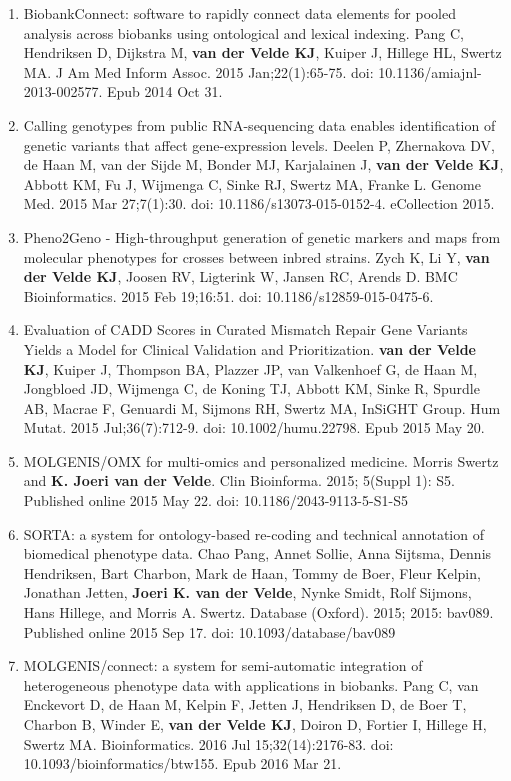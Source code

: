 \begin{appendices}
\begin{enumerate}
\item BiobankConnect: software to rapidly connect data elements for pooled analysis across biobanks using ontological and lexical indexing. Pang C, Hendriksen D, Dijkstra M, \textbf{van der Velde KJ}, Kuiper J, Hillege HL, Swertz MA. J Am Med Inform Assoc. 2015 Jan;22(1):65-75. doi: 10.1136/amiajnl-2013-002577. Epub 2014 Oct 31.
\item Calling genotypes from public RNA-sequencing data enables identification of genetic variants that affect gene-expression levels. Deelen P, Zhernakova DV, de Haan M, van der Sijde M, Bonder MJ, Karjalainen J, \textbf{van der Velde KJ}, Abbott KM, Fu J, Wijmenga C, Sinke RJ, Swertz MA, Franke L. Genome Med. 2015 Mar 27;7(1):30. doi: 10.1186/s13073-015-0152-4. eCollection 2015.
\item Pheno2Geno - High-throughput generation of genetic markers and maps from molecular phenotypes for crosses between inbred strains. Zych K, Li Y, \textbf{van der Velde KJ}, Joosen RV, Ligterink W, Jansen RC, Arends D. BMC Bioinformatics. 2015 Feb 19;16:51. doi: 10.1186/s12859-015-0475-6.
\item Evaluation of CADD Scores in Curated Mismatch Repair Gene Variants Yields a Model for Clinical Validation and Prioritization. \textbf{van der Velde KJ}, Kuiper J, Thompson BA, Plazzer JP, van Valkenhoef G, de Haan M, Jongbloed JD, Wijmenga C, de Koning TJ, Abbott KM, Sinke R, Spurdle AB, Macrae F, Genuardi M, Sijmons RH, Swertz MA, InSiGHT Group. Hum Mutat. 2015 Jul;36(7):712-9. doi: 10.1002/humu.22798. Epub 2015 May 20.
\item MOLGENIS/OMX for multi-omics and personalized medicine. Morris Swertz and \textbf{K. Joeri van der Velde}. Clin Bioinforma. 2015; 5(Suppl 1): S5. Published online 2015 May 22. doi: 10.1186/2043-9113-5-S1-S5
\item SORTA: a system for ontology-based re-coding and technical annotation of biomedical phenotype data. Chao Pang, Annet Sollie, Anna Sijtsma, Dennis Hendriksen, Bart Charbon, Mark de Haan, Tommy de Boer, Fleur Kelpin, Jonathan Jetten, \textbf{Joeri K. van der Velde}, Nynke Smidt, Rolf Sijmons, Hans Hillege, and Morris A. Swertz. Database (Oxford). 2015; 2015: bav089. Published online 2015 Sep 17. doi: 10.1093/database/bav089
\item MOLGENIS/connect: a system for semi-automatic integration of heterogeneous phenotype data with applications in biobanks. Pang C, van Enckevort D, de Haan M, Kelpin F, Jetten J, Hendriksen D, de Boer T, Charbon B, Winder E, \textbf{van der Velde KJ}, Doiron D, Fortier I, Hillege H, Swertz MA. Bioinformatics. 2016 Jul 15;32(14):2176-83. doi: 10.1093/bioinformatics/btw155. Epub 2016 Mar 21.

\end{enumerate}
\end{appendices}
